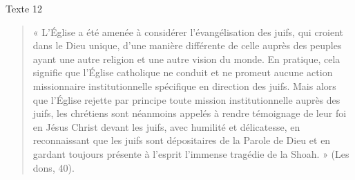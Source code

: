 Texte  12 \begin{quote}
     «  L’Église  a  été  amenée  à  considérer  l’évangélisation  des  juifs,  qui  croient  dans  le  Dieu unique,  d’une  manière  différente  de  celle  auprès  des  peuples  ayant  une  autre  religion  et  une autre  vision  du  monde.  En  pratique,  cela  signifie  que  l’Église  catholique  ne  conduit  et  ne promeut  aucune  action  missionnaire  institutionnelle  spécifique  en  direction  des  juifs.  Mais alors  que  l’Église  rejette  par  principe  toute  mission  institutionnelle  auprès  des  juifs,  les chrétiens  sont  néanmoins  appelés  à  rendre  témoignage  de  leur  foi  en  Jésus  Christ  devant  les juifs,  avec  humilité  et  délicatesse,  en  reconnaissant  que  les  juifs  sont  dépositaires  de  la  Parole de  Dieu  et  en  gardant  toujours  présente  à  l’esprit  l’immense  tragédie  de  la  Shoah.  »  (Les  dons, 40). 
\end{quote} 
